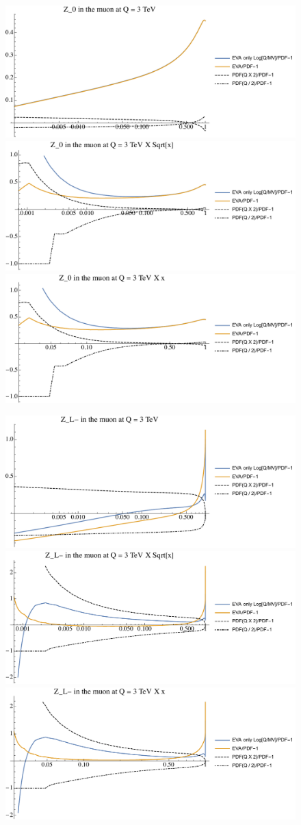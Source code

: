 \documentclass[a4paper,11pt]{article}
\begin{document}
\begin{figure}[ht]
\includegraphics[width=0.46\linewidth]{Notebooks/PlotPDFs/ratios/3TeV/Z_0_Q.pdf}
\includegraphics[width=0.46\linewidth]{Notebooks/PlotPDFs/ratios/3TeV/Z_0_Qsqrtx.pdf}
\includegraphics[width=0.46\linewidth]{Notebooks/PlotPDFs/ratios/3TeV/Z_0_Qx.pdf}
\end{figure}

\begin{figure}[ht]
\includegraphics[width=0.46\linewidth]{Notebooks/PlotPDFs/ratios/3TeV/Z_L-_Q.pdf}
\includegraphics[width=0.46\linewidth]{Notebooks/PlotPDFs/ratios/3TeV/Z_L-_Qsqrtx.pdf}
\includegraphics[width=0.46\linewidth]{Notebooks/PlotPDFs/ratios/3TeV/Z_L-_Qx.pdf}
\end{figure}
\end{document}
